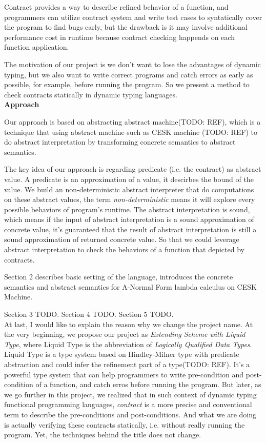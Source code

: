 \documentclass[paper=a4, fontsize=11pt]{scrartcl} %
\numberwithin{equation}{section} %
\numberwithin{figure}{section} %
\numberwithin{table}{section} %
\begin{document}
Contract provides a way to describe refined behavior of a function, and programmers can utilize contract system and write test cases to syntatically cover the program to find bugs early, but the drawback is it may involve additional performance cost in runtime because contract checking happends on each function application.

The motivation of our project is we don't want to lose the advantages of dynamic typing, but we also want to write correct programs and catch errors as early as possible, for example, before running the program. So we present a method to check contracts statically in dynamic typing languages. \\

\textbf{Approach}

Our approach is based on abstracting abstract machine(TODO: REF), which is a technique that using abstract machine such as CESK machine (TODO: REF) to do abstract interpretation by transforming concrete semantics to abstract semantics. 

The key idea of our approach is regarding predicate (i.e. the contract) as abstract value. A predicate is an approximation of a value, it descirbes the bound of the value. We build an non-deterministic abstract interpreter that do computations on these abstract values, the term \textit{non-deterministic} means it will explore every possible behaviors of program's runtime. The abstract interpretation is sound, which means if the input of abstract interpretation is a sound approximation of concrete value, it's guaranteed that the result of abstract interpretation is still a sound approximation of returned concrete value. So that we could leverage abstract interpretation to check the behaviors of a function that depicted by contracts.

Section 2 describes basic setting of the language, introduces the concrete semantics and abstract semantics for A-Normal Form lambda calculus on CESK Machine.

Section 3 TODO. 
Section 4 TODO.
Section 5 TODO. \\

At last, I would like to explain the reason why we change the project name. At the very beginning, we propose our project as \textit{Extending Scheme with Liquid Type}, where Liquid Type is the abbreviation of \textit{Logically Qualified Data Types}. Liquid Type is a type system based on Hindley-Milner type with predicate abstraction and could infer the refinement part of a type(TODO: REF). It's a powerful type system that can help programmers to write pre-condition and post-condition of a function, and catch erros before running the program. But later, as we go further in this project, we realized that in such context of dynamic typing functional programming languages, \textit{contract} is a more precise and conventional term to describe the pre-conditions and post-conditions. And what we are doing is actually verifying these contracts statically, i.e. without really running the program. Yet, the techniques behind the title does not change.
\end{document}
